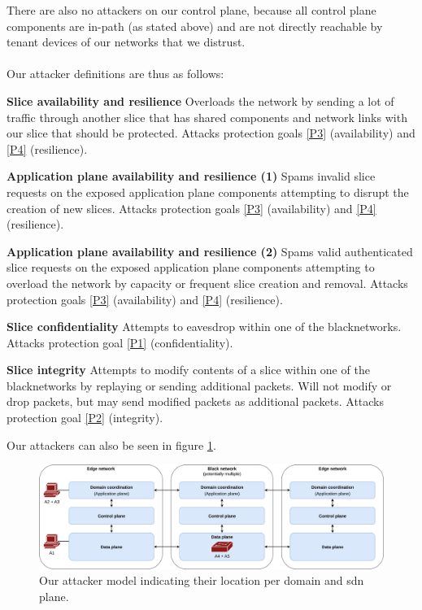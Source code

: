 There are also no attackers on our control plane, because all control plane components are in-path (as stated above) and are not directly reachable by tenant devices of our networks that we distrust.

\paragraph{} Our attacker definitions are thus as follows:
\begin{description}[style=multiline, labelwidth=0.7cm]
    \item[\namedlabel{A1}{A1}] \textbf{Slice availability and resilience} Overloads the network by sending a lot of traffic through another slice that has shared components and network links with our slice that should be protected. Attacks protection goals \ref{P3} (availability) and \ref{P4} (resilience).
    \item[\namedlabel{A2}{A2}] \textbf{Application plane availability and resilience (1)} Spams invalid slice requests on the exposed application plane components attempting to disrupt the creation of new slices. Attacks protection goals \ref{P3} (availability) and \ref{P4} (resilience).
    \item[\namedlabel{A3}{A3}] \textbf{Application plane availability and resilience (2)} Spams valid authenticated slice requests on the exposed application plane components attempting to overload the network by capacity or frequent slice creation and removal. Attacks protection goals \ref{P3} (availability) and \ref{P4} (resilience).
    \item[\namedlabel{A4}{A4}] \textbf{Slice confidentiality} Attempts to eavesdrop within one of the \gls{blacknetwork}s. Attacks protection goal \ref{P1} (confidentiality).
    \item[\namedlabel{A5}{A5}] \textbf{Slice integrity} Attempts to modify contents of a slice within one of the \gls{blacknetwork}s by replaying or sending additional packets. Will not modify or drop packets, but may send modified packets as additional packets. Attacks protection goal \ref{P2} (integrity).
\end{description}

Our attackers can also be seen in figure \ref{fig:attacker_model}.

    \begin{figure}[h]
        \centering
        \includegraphics[width=\linewidth]{images/chapter_4/attacker_model.png}
        \caption[Attacker model]{Our attacker model indicating their location per domain and \acrshort{sdn} plane.}
        \label{fig:attacker_model}
    \end{figure}
